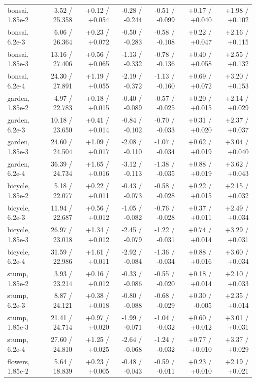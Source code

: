 \documentclass[11pt,a4paper]{article}
\begin{document}
\begin{table}[p]
{\begin{tabular}{@{}lrrrrrr@{}}
bonsai, 1.85e-2 & 3.52 / 25.358 & +0.12 / +0.054 & -0.28 / -0.244 & -0.51 / -0.099 & +0.17 / +0.040 & +1.98 / +0.102 \\
bonsai, 6.2e-3 & 6.06 / 26.364 & +0.23 / +0.072 & -0.50 / -0.283 & -0.58 / -0.108 & +0.22 / +0.047 & +2.16 / +0.115 \\
bonsai, 1.85e-3 & 13.16 / 27.406 & +0.56 / +0.065 & -1.13 / -0.332 & -0.78 / -0.136 & +0.40 / +0.058 & +2.55 / +0.132 \\
bonsai, 6.2e-4 & 24.30 / 27.891 & +1.19 / +0.055 & -2.19 / -0.372 & -1.13 / -0.160 & +0.69 / +0.072 & +3.20 / +0.153 \\
garden, 1.85e-2 & 4.97 / 22.783 & +0.18 / +0.015 & -0.40 / -0.089 & -0.57 / -0.025 & +0.20 / +0.015 & +2.14 / +0.029 \\
garden, 6.2e-3 & 10.18 / 23.650 & +0.41 / +0.014 & -0.84 / -0.102 & -0.70 / -0.033 & +0.31 / +0.020 & +2.37 / +0.037 \\
garden, 1.85e-3 & 24.60 / 24.504 & +1.09 / +0.017 & -2.08 / -0.110 & -1.07 / -0.034 & +0.62 / +0.019 & +3.04 / +0.040 \\
garden, 6.2e-4 & 36.39 / 24.734 & +1.65 / +0.016 & -3.12 / -0.113 & -1.38 / -0.035 & +0.88 / +0.019 & +3.62 / +0.043 \\
bicycle, 1.85e-2 & 5.18 / 22.077 & +0.22 / +0.011 & -0.43 / -0.073 & -0.58 / -0.028 & +0.22 / +0.015 & +2.15 / +0.032 \\
bicycle, 6.2e-3 & 11.94 / 22.687 & +0.56 / +0.012 & -1.05 / -0.082 & -0.76 / -0.028 & +0.37 / +0.011 & +2.49 / +0.034 \\
bicycle, 1.85e-3 & 26.97 / 23.018 & +1.34 / +0.012 & -2.45 / -0.079 & -1.22 / -0.031 & +0.74 / +0.014 & +3.29 / +0.031 \\
bicycle, 6.2e-4 & 31.59 / 22.986 & +1.61 / +0.011 & -2.92 / -0.084 & -1.36 / -0.034 & +0.88 / +0.016 & +3.60 / +0.034 \\
stump, 1.85e-2 & 3.93 / 23.214 & +0.16 / +0.012 & -0.33 / -0.086 & -0.55 / -0.020 & +0.18 / +0.014 & +2.10 / +0.033 \\
stump, 6.2e-3 & 8.87 / 24.121 & +0.38 / +0.018 & -0.80 / -0.088 & -0.68 / -0.029 & +0.30 / -0.005 & +2.35 / +0.014 \\
stump, 1.85e-3 & 21.41 / 24.714 & +0.97 / +0.020 & -1.99 / -0.071 & -1.04 / -0.032 & +0.60 / +0.012 & +3.01 / +0.031 \\
stump, 6.2e-4 & 27.60 / 24.810 & +1.25 / +0.025 & -2.64 / -0.068 & -1.24 / -0.032 & +0.77 / +0.010 & +3.37 / +0.029 \\
flowers, 1.85e-2 & 5.64 / 18.839 & +0.23 / +0.005 & -0.48 / -0.043 & -0.59 / -0.011 & +0.23 / +0.010 & +2.19 / +0.021 \\

\end{tabular}}
\end{table}
\end{document}
